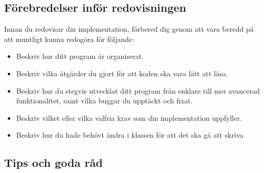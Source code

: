 \subsection{Förebredelser inför redovisningen}
Innan du redovisar din implementation, förbered dig genom att vara beredd på att muntligt kunna redogöra för följande:
\begin{itemize}[nosep, label={$\square$}]
  \item Beskriv hur ditt program är organiserat.
  \item Beskriv vilka åtgärder du gjort för att koden ska vara lätt att läsa.
  \item Beskriv hur du stegvis utvecklat ditt program från enklare till mer avancerad funktionalitet, samt vilka buggar du upptäckt och fixat.
  \item Beskriv vilket eller vilka valfria krav som din implementation uppfyller.
  \item Beskriv hur du hade behövt ändra i klassen  för att det ska gå att skriva 
\end{itemize}

\subsection{Tips och goda råd}




